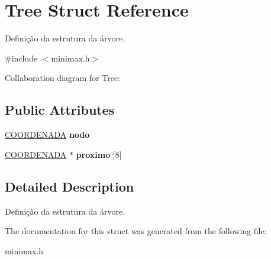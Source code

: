 \hypertarget{structTree}{}\section{Tree Struct Reference}
\label{structTree}


Definição da estrutura da árvore.  




{\ttfamily \#include $<$minimax.\+h$>$}



Collaboration diagram for Tree\+:
\subsection*{Public Attributes}
\begin{DoxyCompactItemize}
\item 
\mbox{\label{structTree_abc891f05ffdda2289c85cf805b12ab64}} 
\hyperlink{structCOORDENADA}{C\+O\+O\+R\+D\+E\+N\+A\+DA} {\bfseries nodo}
\item 
\mbox{\label{structTree_a16b9142f01bb4396e308d28475134f7c}} 
\hyperlink{structCOORDENADA}{C\+O\+O\+R\+D\+E\+N\+A\+DA} $\ast$ {\bfseries proximo} \mbox{[}8\mbox{]}
\end{DoxyCompactItemize}


\subsection{Detailed Description}
Definição da estrutura da árvore. 

The documentation for this struct was generated from the following file\+:\begin{DoxyCompactItemize}
\item 
minimax.\+h\end{DoxyCompactItemize}
